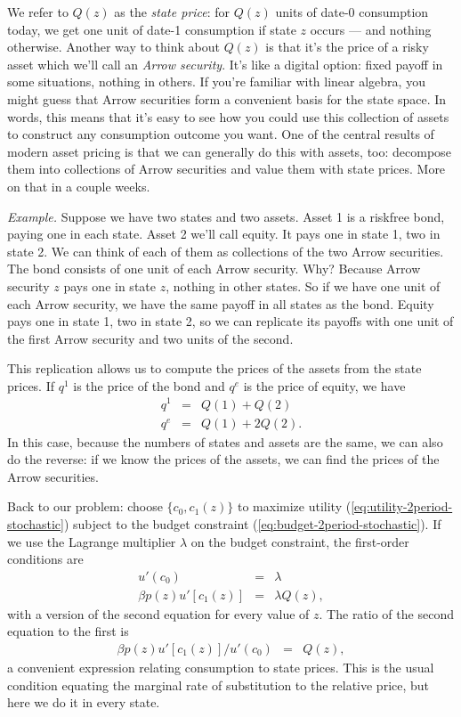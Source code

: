 \documentclass[11pt]{article}
\begin{document}
We refer to $Q(z)$ as the {\it state price\/}:
for $Q(z)$ units of date-0 consumption today, we get one
unit of date-1 consumption if state $z$ occurs --- and nothing otherwise.
Another way to think about $Q(z)$ is that it's the price of a risky asset
which we'll call an {\it Arrow security\/}.
It's like a digital option:  fixed payoff in some situations, nothing in others.
If you're familiar with linear algebra,
you might guess that {Arrow securities}
form a convenient basis for the state space.
In words, this means that it's easy to see how you could
use this collection of assets to construct any consumption outcome you want.
One of the central results of modern asset pricing is that
we can generally do this with assets, too:  decompose them
into collections of Arrow securities and value them with state prices.
More on that in a couple weeks.

{\it Example.\/}
Suppose we have two states and two assets.
Asset 1 is a riskfree bond, paying one in each state.
Asset 2 we'll call equity.  It pays one in state 1, two in state 2.
We can think of each of them as collections of the two Arrow securities.
The bond consists of one unit of each Arrow security.
Why?  Because Arrow security $z$ pays one in state $z$, nothing in other states.
So if we have one unit of each Arrow security,
we have the same payoff in all states as the bond.
Equity pays one in state 1, two in state 2,
so we can replicate its payoffs with one unit of the first Arrow security
and two units of the second.

This replication allows us to compute the prices of the assets from the state prices.
If $q^1$ is the price of the bond and $q^e$ is the price of equity, we have
\begin{eqnarray*}
    q^1 &=& Q(1) + Q(2) \\
    q^e &=& Q(1) + 2 Q(2) .
\end{eqnarray*}
In this case, because the numbers of states and assets are the same,
we can also do the reverse:  if we know the prices of the assets,
we can find the prices of the Arrow securities.





Back to our problem:  choose $\{c_0, c_1(z)\}$ to maximize
utility (\ref{eq:utility-2period-stochastic}) subject to the budget constraint
(\ref{eq:budget-2period-stochastic}).
If we use the Lagrange multiplier $\lambda$ on the budget constraint,
the first-order conditions are
\begin{eqnarray*}
    u'(c_0)  &=& \lambda  \\
       \beta p(z) u'[c_1(z)]  &=& \lambda Q(z),
\end{eqnarray*}
with a version of the second equation for every value of $z$.
The ratio of the second equation to the first is
\begin{eqnarray*}
    \beta p(z) u'[c_1(z)]/u'(c_0) &=& Q(z) ,
\end{eqnarray*}
a convenient expression relating consumption to state prices.
This is the usual condition equating the marginal rate of substitution
to the relative price, but here we do it in every state.
\end{document}
